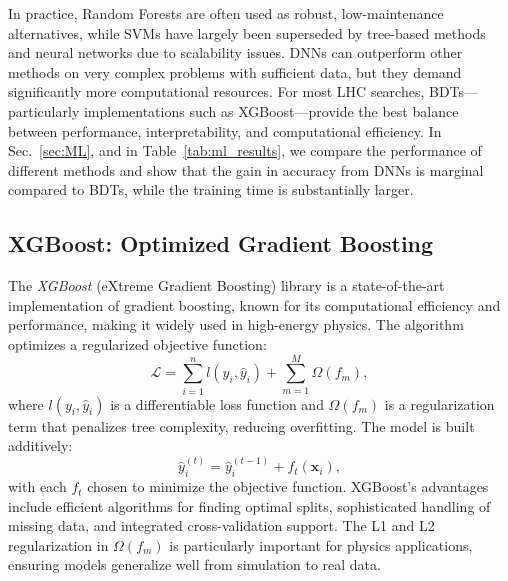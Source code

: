 In practice, Random Forests are often used as robust, low-maintenance alternatives, while SVMs have largely been superseded by tree-based methods and neural networks due to scalability issues. DNNs can outperform other methods on very complex problems with sufficient data, but they demand significantly more computational resources. For most LHC searches, BDTs—particularly implementations such as XGBoost—provide the best balance between performance, interpretability, and computational efficiency. In Sec.~\ref{sec:ML}, and in Table~\ref{tab:ml_results}, we compare the performance of different methods and show that the gain in accuracy from DNNs is marginal compared to BDTs, while the training time is substantially larger.


\subsection{XGBoost: Optimized Gradient Boosting}
\label{ssec:xgboost}

The \textit{XGBoost} (eXtreme Gradient Boosting) library is a state-of-the-art implementation of gradient boosting, known for its computational efficiency and performance, making it widely used in high-energy physics. The algorithm optimizes a regularized objective function:
\begin{equation}
\mathcal{L} = \sum_{i=1}^{n} l(y_i, \hat{y}_i) + \sum_{m=1}^{M} \Omega(f_m),
\end{equation}
where $l(y_i, \hat{y}_i)$ is a differentiable loss function and $\Omega(f_m)$ is a regularization term that penalizes tree complexity, reducing overfitting. The model is built additively:
\begin{equation}
\hat{y}_i^{(t)} = \hat{y}_i^{(t-1)} + f_t(\mathbf{x}_i),
\end{equation}
with each $f_t$ chosen to minimize the objective function. XGBoost's advantages include efficient algorithms for finding optimal splits, sophisticated handling of missing data, and integrated cross-validation support. The L1 and L2 regularization in $\Omega(f_m)$ is particularly important for physics applications, ensuring models generalize well from simulation to real data.

